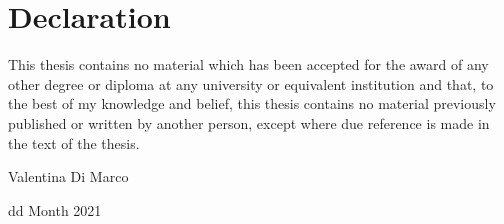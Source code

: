 \section*{Declaration}

\vspace{1cm}

{
  This thesis contains no material which has been accepted for the
  award of any other degree or diploma at any university or equivalent
  institution and that, to the best of my knowledge and belief, this
  thesis contains no material previously published or written by
  another person, except where due reference is made in the text of
  the thesis.
}

\vspace{1cm}


\qquad Valentina Di Marco

\qquad dd Month 2021


\clearpage
